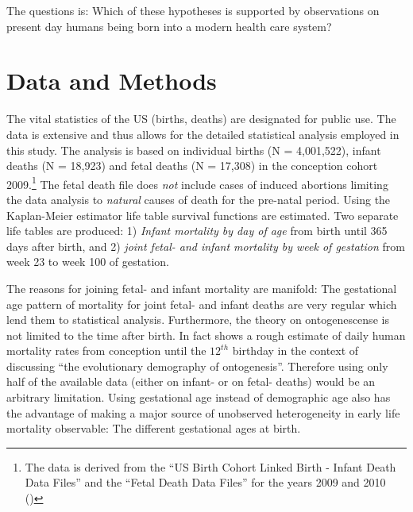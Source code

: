 \documentclass[12pt, parskip=half]{scrartcl}
\begin{document}

The questions is: Which of these hypotheses is supported by observations on present day humans being born into a modern health care system?

\section{Data and Methods} %
\label{sec:data_and_methods}

The vital statistics of the US (births, deaths) are designated for public use. The data is extensive and thus allows for the detailed statistical analysis employed in this study. The analysis is based on individual births (N = 4,001,522), infant deaths (N = 18,923) and fetal deaths (N = 17,308) in the conception cohort 2009.\footnote{The data is derived from the \enquote{US Birth Cohort Linked Birth - Infant Death Data Files} and the \enquote{Fetal Death Data Files} for the years 2009 and 2010 (\cite{DVS2015})} The fetal death file does \emph{not} include cases of induced abortions limiting the data analysis to \emph{natural} causes of death for the pre-natal period. Using the Kaplan-Meier estimator life table survival functions are estimated. Two separate life tables are produced: 1) \emph{Infant mortality by day of age} from birth until 365 days after birth, and 2) \emph{joint fetal- and infant mortality by week of gestation} from week 23 to week 100 of gestation.

The reasons for joining fetal- and infant mortality are manifold: The gestational age pattern of mortality for joint fetal- and infant deaths are very regular which lend them to statistical analysis. Furthermore, the theory on ontogenescense is not limited to the time after birth. In fact \textcite{Levitis2011} shows a rough estimate of daily human mortality rates from conception until the $12^{th}$ birthday in the context of discussing \enquote{the evolutionary demography of ontogenesis}. Therefore using only half of the available data (either on infant- or on fetal- deaths) would be an arbitrary limitation. Using gestational age instead of demographic age also has the advantage of making a major source of unobserved heterogeneity in early life mortality observable: The different gestational ages at birth.
\end{document}
